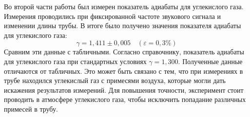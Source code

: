 \documentclass[12pt,a4paper]{article}
\begin{document}
Во второй части работы был измерен показатель адиабаты для углекислого газа. Измерения проводились при фиксированной частоте звукового сигнала и изменении длины трубы. В итоге было получено значения показателя адиабаты для углекислого газа: \[ \boxed{\gamma = 1,411\pm0,005}\quad (\varepsilon=0,3\%) \] Сравним эти данные с табличными. Согласно справочнику, показатель адиабаты для углекислого газа при стандартных условиях \underline{$ \gamma = 1,300 $}. Полученные данные отличаются от табличных. Это может быть связано с тем, что при измерениях в трубе находился углекислый газ с примесями воздуха, которые могли дать искажения результатов измерений. Для повышения точности, эксперимент стоит проводить в атмосфере углекислого газа, чтобы исключить попадание различных примесей в трубу.
\end{document}
